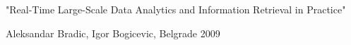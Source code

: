 "Real-Time Large-Scale Data Analytics and Information Retrieval in Practice"

Aleksandar Bradic, Igor Bogicevic, Belgrade 2009